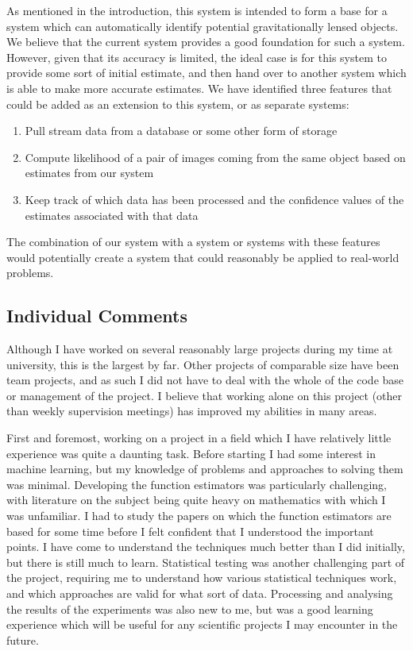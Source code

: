 \documentclass[a4paper,11pt,twoside]{article}
\begin{document}
   As mentioned in the introduction, this system is intended to form a base for
   a system which can automatically identify potential gravitationally lensed
   objects. We believe that the current system provides a good foundation for
   such a system. However, given that its accuracy is limited, the ideal case is
   for this system to provide some sort of initial estimate, and then hand over
   to another system which is able to make more accurate estimates. We have
   identified three features that could be added as an extension to this system,
   or as separate systems:
\begin{enumerate}
\item Pull stream data from a database or some other form of storage
\item Compute likelihood of a pair of images coming from the same object based on
   estimates from our system
\item Keep track of which data has been processed and the confidence
   values of the estimates associated with that data
\end{enumerate}

   The combination of our system with a system or systems with these features would
   potentially create a system that could reasonably be applied to real-world problems.
\subsection{Individual Comments}
\label{sec-9-2}

   Although I have worked on several reasonably large projects during my time at
   university, this is the largest by far. Other projects of comparable size
   have been team projects, and as such I did not have to deal with the whole of
   the code base or management of the project. I believe that working alone on
   this project (other than weekly supervision meetings) has improved my
   abilities in many areas. 

   First and foremost, working on a project in a field which I have relatively
   little experience was quite a daunting task. Before starting I had some
   interest in machine learning, but my knowledge of problems and approaches to
   solving them was minimal. Developing the function estimators was particularly
   challenging, with literature on the subject being quite heavy on mathematics
   with which I was unfamiliar. I had to study the papers on which the function
   estimators are based for some time before I felt confident that I understood
   the important points. I have come to understand the techniques much better
   than I did initially, but there is still much to learn. Statistical testing
   was another challenging part of the project, requiring me to understand how
   various statistical techniques work, and which approaches are valid for what
   sort of data. Processing and analysing the results of the experiments was
   also new to me, but was a good learning experience which will be useful for
   any scientific projects I may encounter in the future.
\end{document}
